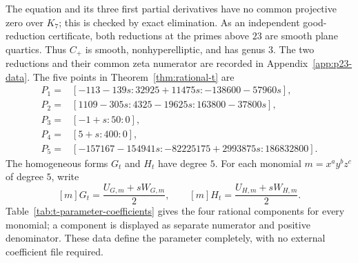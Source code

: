 \documentclass[11pt]{article}
\theoremstyle{definition}
\theoremstyle{remark}
\begin{document}
The equation and its three first partial derivatives have no common
projective zero over $K_7$; this is checked by exact elimination.  As an
independent good-reduction certificate, both reductions at the primes above
$23$ are smooth plane quartics.  Thus $C_+$ is smooth, nonhyperelliptic, and
has genus $3$.  The two reductions and their common zeta numerator are
recorded in Appendix~\ref{app:p23-data}.
The five points in Theorem~\ref{thm:rational-t} are
\begin{align*}
P_1={}&[-113-139s:32925+11475s:-138600-57960s],\\
P_2={}&[1109-305s:4325-19625s:163800-37800s],\\
P_3={}&[-1+s:50:0],\\
P_4={}&[5+s:400:0],\\
P_5={}&[-157167-154941s:-82225175+2993875s:186832800].
\end{align*}
The homogeneous forms $G_t$ and $H_t$ have degree $5$.  For each monomial
$m=x^ay^bz^c$ of degree $5$, write
\[
 [m]G_t=\frac{U_{G,m}+sW_{G,m}}2,
 \qquad
 [m]H_t=\frac{U_{H,m}+sW_{H,m}}2.
\]
Table~\ref{tab:t-parameter-coefficients} gives the four rational components
for every monomial; a component is displayed as separate numerator and
positive denominator.  These data define the parameter completely, with no
external coefficient file required.
\end{document}
